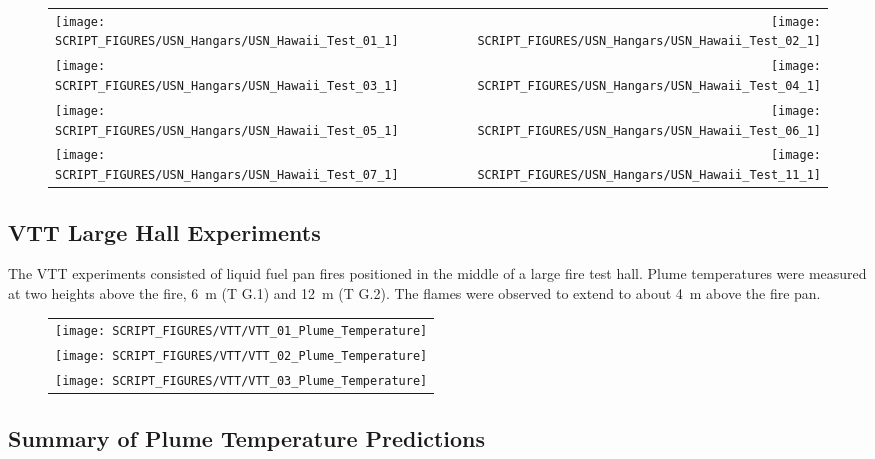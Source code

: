 \begin{figure}[p]
\begin{tabular*}{\textwidth}{l@{\extracolsep{\fill}}r}
\texttt{[image: SCRIPT\_FIGURES/USN\_Hangars/USN\_Hawaii\_Test\_01\_1]} &
\texttt{[image: SCRIPT\_FIGURES/USN\_Hangars/USN\_Hawaii\_Test\_02\_1]} \\
\texttt{[image: SCRIPT\_FIGURES/USN\_Hangars/USN\_Hawaii\_Test\_03\_1]} &
\texttt{[image: SCRIPT\_FIGURES/USN\_Hangars/USN\_Hawaii\_Test\_04\_1]} \\
\texttt{[image: SCRIPT\_FIGURES/USN\_Hangars/USN\_Hawaii\_Test\_05\_1]} &
\texttt{[image: SCRIPT\_FIGURES/USN\_Hangars/USN\_Hawaii\_Test\_06\_1]} \\
\texttt{[image: SCRIPT\_FIGURES/USN\_Hangars/USN\_Hawaii\_Test\_07\_1]} &
\texttt{[image: SCRIPT\_FIGURES/USN\_Hangars/USN\_Hawaii\_Test\_11\_1]}
\end{tabular*}
\label{USN_Plume_Hawaii}
\end{figure}

\clearpage

\subsection{VTT Large Hall Experiments}

\label{VTT_plume}

The VTT experiments consisted of liquid fuel pan fires positioned in the middle of a large fire test hall. Plume temperatures were measured at two heights above the fire, 6~m (T G.1) and 12~m (T G.2). The flames were observed to extend to about 4~m above the fire pan.


\begin{figure}[h]
\begin{center}
\begin{tabular}{c}
\texttt{[image: SCRIPT\_FIGURES/VTT/VTT\_01\_Plume\_Temperature]} \\
\texttt{[image: SCRIPT\_FIGURES/VTT/VTT\_02\_Plume\_Temperature]} \\
\texttt{[image: SCRIPT\_FIGURES/VTT/VTT\_03\_Plume\_Temperature]}
\end{tabular}
\end{center}
\label{VTT_Plume}
\end{figure}


\clearpage


\subsection{Summary of Plume Temperature Predictions}




